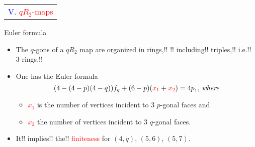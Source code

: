 \documentclass[%
pdf,
colorBG,
slideColor,
]{prosper}
\begin{document}
\begin{slide}{}
\begin{center}
{\Huge 
\begin{tabular*}{8cm}{c}
\\[-0.5cm]
\textcolor{blue}{V. }\textcolor{red}{$qR_2$-maps}\\
\end{tabular*}
}
\end{center}
\end{slide}









\begin{slide}{Euler formula}
\begin{itemize}
\item The $q$-gons of a $qR_2$ map are organized in rings,!! 
!!%
including!! triples,!! i.e.!! 3-rings.!!
\item One has the Euler formula
\begin{equation*}
(4-(4-p)(4-q))f_q+(6-p)(\textcolor{red}{x_1}+\textcolor{red}{x_2})=4p, \mbox{,~{\em where}}
\end{equation*}
\begin{itemize}
\item \textcolor{red}{$x_1$} is the number of vertices incident to $3$ $p$-gonal faces and
\item \textcolor{red}{$x_2$} the number of vertices incident to $3$ $q$-gonal faces.
\end{itemize}
\item It!! implies!! the!! \textcolor{red}{finiteness} for $(4,q)$, $(5,6)$, 
$(5,7)$.
\end{itemize}

\end{slide}
\end{document}
